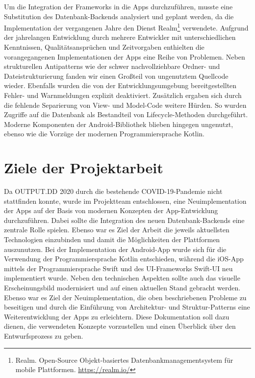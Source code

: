 Um die Integration der Frameworks in die Apps durchzuführen, musste eine Substitution des Datenbank-Backends analysiert und geplant werden, da die Implementation der vergangenen Jahre den Dienst Realm\footnote{Realm. Open-Source Objekt-basiertes Datenbankmanagementsystem für mobile Plattformen. \newline \url{https://realm.io/}} verwendete. Aufgrund der jahrelangen Entwicklung durch mehrere Entwickler mit unterschiedlichen Kenntnissen, Qualitätsansprüchen und Zeitvorgaben enthielten die vorangegangenen Implementationen der Apps eine Reihe von Problemen. Neben strukturellen Antipatterns wie der schwer nachvollziehbare Ordner- und Dateistrukturierung fanden wir einen Großteil von ungenutztem Quellcode wieder. Ebenfalls wurden die von der Entwicklungsumgebung bereitgestellten Fehler- und Warnmeldungen explizit deaktiviert. Zusätzlich ergaben sich durch die fehlende Separierung von View- und Model-Code weitere Hürden. So wurden Zugriffe auf die Datenbank als Bestandteil von Lifecycle-Methoden durchgeführt. Moderne Komponenten der Android-Bibliothek blieben hingegen ungenutzt, ebenso wie die Vorzüge der modernen Programmiersprache Kotlin.    

\section{Ziele der Projektarbeit}\label{sec:goals}

Da OUTPUT.DD 2020 durch die bestehende COVID-19-Pandemie nicht stattfinden konnte, wurde im Projektteam entschlossen, eine Neuimplementation der Apps auf der Basis von modernen Konzepten der App-Entwicklung durchzuführen. Dabei sollte die Integration des neuen Datenbank-Backends eine zentrale Rolle spielen. Ebenso war es Ziel der Arbeit die jeweils aktuellsten Technologien einzubinden und damit die Möglichkeiten der Plattformen auszunutzen. Bei der Implementation der Android-App wurde sich für die Verwendung der Programmiersprache Kotlin entschieden, während die iOS-App mittels der Programmiersprache Swift und des UI-Frameworks Swift-UI neu implementiert wurde. Neben den technischen Aspekten sollte auch das visuelle Erscheinungsbild modernisiert und auf einen aktuellen Stand gebracht werden. Ebenso war es Ziel der Neuimplementation, die oben beschriebenen Probleme zu beseitigen und durch die Einführung von Architektur- und Struktur-Patterns eine Weiterentwicklung der Apps zu erleichtern. Diese Dokumentation soll dazu dienen, die verwendeten Konzepte vorzustellen und einen Überblick über den Entwurfsprozess zu geben.
